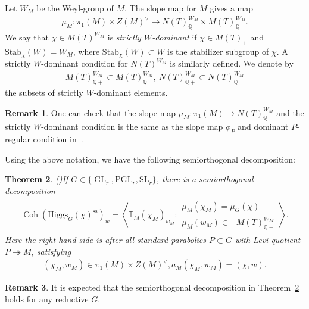 \documentclass [11pt,oneside,a4paper,mathscr]{amsart}
\newtheorem{thm}{Theorem}[section]
\theoremstyle{definition}
\newtheorem{remark}[thm]{Remark}
\newcommand{\Coh}{\operatorname{Coh}}
\newcommand{\GL}{\operatorname{GL}}
\newcommand{\Hig}{\mathrm{Higgs}}
\begin{document}
Let $W_{M}$ be the Weyl-group of $M$. 
The slope map for $M$ gives a map 
\begin{align*}
    \mu_M \colon \pi_1(M)\times Z(M)^{\vee} \to N(T)_{\mathbb{Q}}^{W_M}\times M(T)^{W_M}_{\mathbb{Q}}.
\end{align*}
We say that $\chi \in M(T)^{W_{M}}$ is \textit{strictly $W$-dominant} if 
$\chi \in M(T)_+$ and $\mathrm{Stab}_{\chi}(W)=W_{M}$, where $\mathrm{Stab}_{\chi}(W) \subset W$ is the stabilizer subgroup of $\chi$. A strictly $W$-dominant condition for $N(T)^{W_{M}}$ is 
similarly defined. 
We denote by 
\begin{align*}M(T)_{\mathbb{Q}+}^{W_{M}} \subset M(T)^{W_{M}}_{\mathbb{Q}}, \ N(T)_{\mathbb{Q}+}^{W_{M}}\subset N(T)_{\mathbb{Q}}^{W_{M}}
\end{align*}
the subsets of strictly $W$-dominant elements. 
\begin{remark}\label{rmk:dominant}
One can check that the slope map $\mu_M \colon \pi_1(M) \to N(T)_{\mathbb{Q}}^{W_M}$ and the strictly $W$-dominant 
condition is the same as the slope map $\phi_P$ and dominant $P$-regular condition in~\cite[Section~2.1]{SchHN}.
\end{remark}

Using the above notation, we have the following semiorthogonal decomposition: 
\begin{thm}\emph{(\cite{PThiggs})}\label{thm:PThiggs}
If $G \in \{\GL_r, \mathrm{PGL}_r, \mathrm{SL}_r\}$, there is a semiorthogonal decomposition 
\begin{align*}
    \Coh(\Hig_G(\chi)^{\mathrm{ss}})_w=
    \left\langle \mathbb{T}_{M}(\chi_{M})_{w_{M}} : \begin{array}{ll}\mu_M(\chi_M)=\mu_G(\chi) \\
     \mu_M(w_{M}) \in 
   -M(T)_{\mathbb{Q}+}^{W_{M}} \end{array}
    \right\rangle. 
\end{align*}
    Here the right-hand side is after all standard parabolics $P\subset G$ with 
    Levi quotient $P\twoheadrightarrow M$, satisfying
    \begin{align*}(\chi_{M}, w_{M}) \in \pi_1(M) \times Z(M)^{\vee}, \mathbb{}a_{M}(\chi_{M}, w_{M})=(\chi, w).
    \end{align*}
\end{thm}
\begin{remark}
It is expected that the semiorthogonal decomposition in Theorem~\ref{thm:PThiggs} holds 
for any reductive $G$. 
\end{remark}
\end{document}
